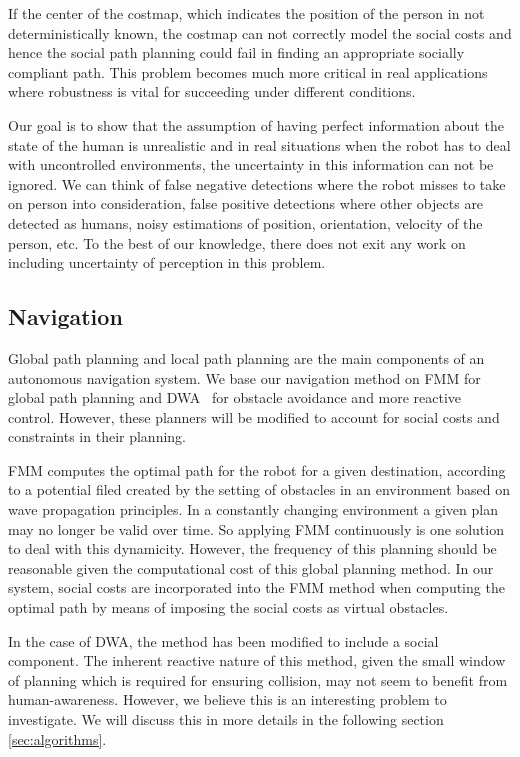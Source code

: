 If the center of the costmap, which indicates the position of the person in not deterministically known, the costmap can not correctly model the social costs and hence the social path planning could fail in finding an appropriate socially compliant path. This problem becomes much more critical in real applications where robustness is vital for succeeding under different conditions.

Our goal is to show that the assumption of having perfect information about the state of the human is unrealistic and in real situations when the robot has to deal with uncontrolled environments, the uncertainty in this information can not be ignored. We can think of false negative detections where the robot misses to take on person into consideration, false positive detections where other objects are detected as humans, noisy estimations of position, orientation, velocity of the person, etc. To the best of our knowledge, there does not exit any work on including uncertainty of perception in this problem.

\subsection{Navigation}

Global path planning and local path planning are the main components of an autonomous navigation system.
We base our navigation method on FMM \cite{ventura2015} for global path planning and DWA~\cite{fox1997dynamic} for obstacle avoidance and more reactive control. However, these planners will be modified to account for social costs and constraints in their planning. 

FMM computes the optimal path for the robot for a given destination, according to a potential filed created by the setting of obstacles in an environment based on wave propagation principles. In a constantly changing environment a given plan may no longer be valid over time. So applying FMM continuously is one solution to deal with this dynamicity. However, the frequency of this planning should be reasonable given the computational cost of this global planning method. In our system, social costs are incorporated into the FMM method when computing the optimal path by means of imposing the social costs as virtual obstacles.

In the case of DWA, the method has been modified to include a social component. The inherent reactive nature of this method, given the small window of planning which is required for ensuring collision, may not seem to benefit from human-awareness. However, we believe this is an interesting problem to investigate. We will discuss this in more details in the following section \ref{sec:algorithms}.


